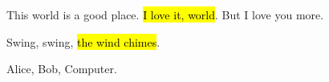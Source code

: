 This world is a good place.
\hl{I love it, world}.
But I love you more.

Swing, swing, \hl{the wind chimes}.

Alice, Bob, Computer.